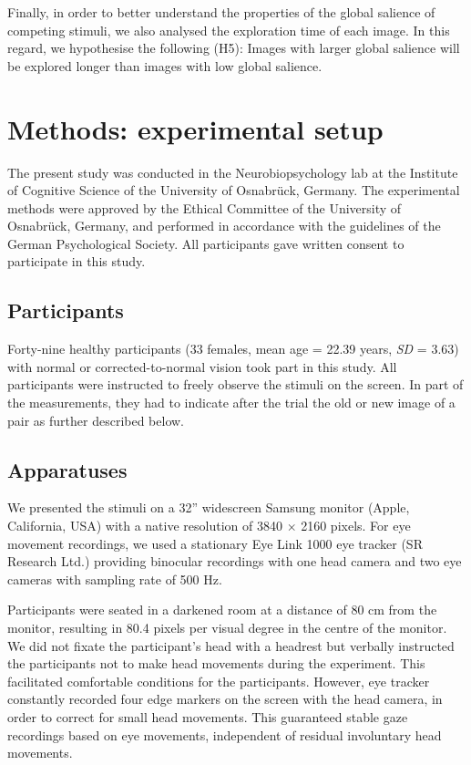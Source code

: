 {Finally, in order to better understand the properties of the global salience of competing stimuli, we also analysed the exploration time of each image. In this regard, we hypothesise the following (H5): Images with larger global salience will be explored longer than images with low global salience.

\section{Methods: experimental setup}
\label{sec:globsal-methods}
The present study was conducted in the Neurobiopsychology lab at the Institute of Cognitive Science of the University of Osnabr\"uck, Germany. The experimental methods were approved by the Ethical Committee of the University of Osnabr\"uck, Germany, and performed in accordance with the guidelines of the German Psychological Society. All participants gave written consent to participate in this study. 

\subsection{Participants}
\label{sec:globsal-methods_participants}
Forty-nine healthy participants (33 females, mean age = 22.39 years, \textit{SD} = 3.63) with normal or corrected-to-normal vision took part in this study. All participants were instructed to freely observe the stimuli on the screen. In part of the measurements, they had to indicate after the trial the old or new image of a pair as further described below.  

\subsection{Apparatuses}
\label{sec:globsal-methods_apparatuses}
We presented the stimuli on a 32'' widescreen Samsung monitor (Apple, California, USA) with a native resolution of 3840 $\times$ 2160 pixels. For eye movement recordings, we used a stationary Eye Link 1000 eye tracker (SR Research Ltd.) providing binocular recordings with one head camera and two eye cameras with sampling rate of 500 Hz.

Participants were seated in a darkened room at a distance of 80 cm from the monitor, resulting in 80.4 pixels per visual degree in the centre of the monitor. We did not fixate the participant's head with a headrest but verbally instructed the participants not to make head movements during the experiment. This facilitated comfortable conditions for the participants. However, eye tracker constantly recorded four edge markers on the screen with the head camera, in order to correct for small head movements. This guaranteed stable gaze recordings based on eye movements, independent of residual involuntary head movements. 

}
